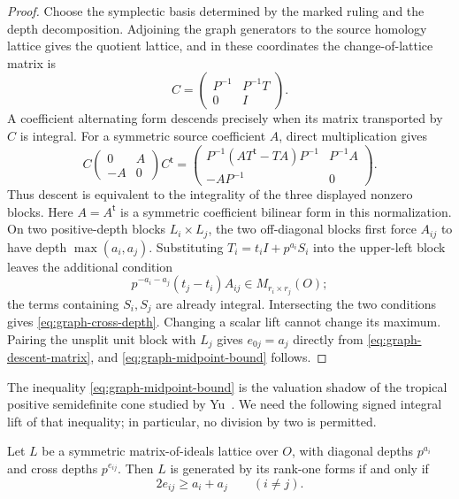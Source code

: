 \begin{proof}
Choose the symplectic basis determined by the marked ruling and the depth
decomposition.  Adjoining the graph generators to the source homology
lattice gives the quotient lattice, and in these coordinates the
change-of-lattice matrix is
\[
 C=\begin{pmatrix}P^{-1}&P^{-1}T\\0&I\end{pmatrix}.
\]
A coefficient alternating form descends precisely when its matrix transported
by \(C\) is integral.  For a symmetric source coefficient \(A\), direct
multiplication gives
\begin{equation}
 C\begin{pmatrix}0&A\\-A&0\end{pmatrix}C^{\mathsf t}
 =
 \begin{pmatrix}
 P^{-1}(AT^{\mathsf t}-TA)P^{-1}&P^{-1}A\\
 -AP^{-1}&0
 \end{pmatrix}.
 \label{eq:graph-descent-matrix}
\end{equation}
Thus descent is equivalent to the integrality of the three displayed
nonzero blocks.  Here \(A=A^{\mathsf t}\) is a symmetric coefficient
bilinear form in this normalization.  On two positive-depth blocks
\(L_i\times L_j\), the two off-diagonal blocks first
force \(A_{ij}\) to have depth \(\max(a_i,a_j)\).  Substituting
\(T_i=t_iI+p^{a_i}S_i\) into the upper-left block leaves the additional
condition
\[
 p^{-a_i-a_j}(t_j-t_i)A_{ij}\in M_{r_i\times r_j}(O);
\]
the terms containing \(S_i,S_j\) are already integral.  Intersecting the two
conditions gives \eqref{eq:graph-cross-depth}.  Changing a scalar lift cannot
change its maximum.
Pairing the unsplit unit block with \(L_j\) gives \(e_{0j}=a_j\) directly
from \eqref{eq:graph-descent-matrix}, and
\eqref{eq:graph-midpoint-bound} follows.
\end{proof}

The inequality \eqref{eq:graph-midpoint-bound} is the valuation shadow of the tropical positive
semidefinite cone studied by Yu~\cite{YuTropical}.  We need the following
signed integral lift of that inequality; in particular, no division by two
is permitted.

\begin{lemma}
\label{lem:dvr-rank-one}
%
%
Let \(L\) be a symmetric matrix-of-ideals lattice over \(O\), with diagonal
depths \(p^{a_i}\) and cross depths \(p^{e_{ij}}\).  Then \(L\) is generated
by its rank-one forms if and only if
\[
 2e_{ij}\geq a_i+a_j\qquad(i\ne j).
\]
\end{lemma}

